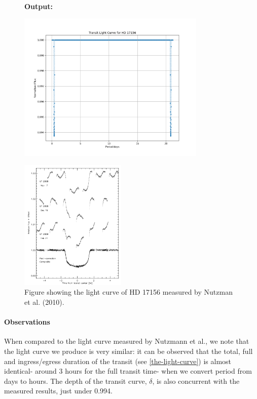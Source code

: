 \documentclass[11pt]{article}
\newcommand*{\figuretitle}[1]{
    	{\textbf{#1}
    	\par\vspace{-1em}}
    }
\begin{document}
\begin{figure}
	\figuretitle{Output:}
	\centering
	\includegraphics[width=0.8\textwidth]{../matplotlib_graphs/transit_1.png}
\end{figure}    


\begin{figure}
	\centering 
	\includegraphics[width=0.45\textwidth]{../images/light_curve.png}
	\caption{Figure showing the light curve of HD 17156 measured by Nutzman et al. (2010).} 
	\label{Figure 4.a}
\end{figure}

    \hypertarget{observations}{%
\paragraph{Observations}\label{observations_1}}

When compared to the light curve measured by Nutzmann et al., we note
that the light curve we produce is very similar: it can be observed that the total, full and ingress/egress duration of the transit (see \ref{the-light-curve}) is almost identical- around 3 hours for the full transit time- when we convert period from days to hours. The depth of the transit curve, \(\delta\), is also concurrent with the measured results, just under 0.994.
\end{document}
